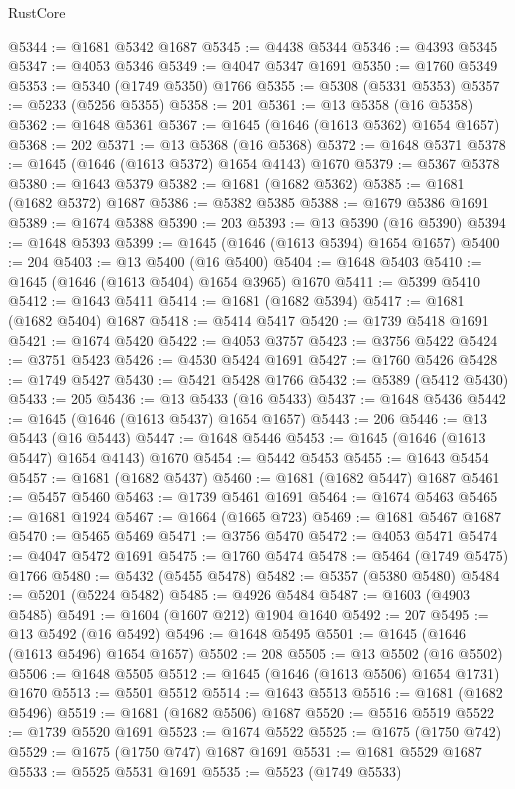 \begin{lexlean}{RustCore}
\begin{coremodule}
@5344 := @1681 @5342 @1687
@5345 := @4438 @5344
@5346 := @4393 @5345
@5347 := @4053 @5346
@5349 := @4047 @5347 @1691
@5350 := @1760 @5349
@5353 := @5340 (@1749 @5350) @1766
@5355 := @5308 (@5331 @5353)
@5357 := @5233 (@5256 @5355)
@5358 := 201
@5361 := @13 @5358 (@16 @5358)
@5362 := @1648 @5361
@5367 := @1645 (@1646 (@1613 @5362) @1654 @1657)
@5368 := 202
@5371 := @13 @5368 (@16 @5368)
@5372 := @1648 @5371
@5378 := @1645 (@1646 (@1613 @5372) @1654 @4143) @1670
@5379 := @5367 @5378
@5380 := @1643 @5379
@5382 := @1681 (@1682 @5362)
@5385 := @1681 (@1682 @5372) @1687
@5386 := @5382 @5385
@5388 := @1679 @5386 @1691
@5389 := @1674 @5388
@5390 := 203
@5393 := @13 @5390 (@16 @5390)
@5394 := @1648 @5393
@5399 := @1645 (@1646 (@1613 @5394) @1654 @1657)
@5400 := 204
@5403 := @13 @5400 (@16 @5400)
@5404 := @1648 @5403
@5410 := @1645 (@1646 (@1613 @5404) @1654 @3965) @1670
@5411 := @5399 @5410
@5412 := @1643 @5411
@5414 := @1681 (@1682 @5394)
@5417 := @1681 (@1682 @5404) @1687
@5418 := @5414 @5417
@5420 := @1739 @5418 @1691
@5421 := @1674 @5420
@5422 := @4053 @3757
@5423 := @3756 @5422
@5424 := @3751 @5423
@5426 := @4530 @5424 @1691
@5427 := @1760 @5426
@5428 := @1749 @5427
@5430 := @5421 @5428 @1766
@5432 := @5389 (@5412 @5430)
@5433 := 205
@5436 := @13 @5433 (@16 @5433)
@5437 := @1648 @5436
@5442 := @1645 (@1646 (@1613 @5437) @1654 @1657)
@5443 := 206
@5446 := @13 @5443 (@16 @5443)
@5447 := @1648 @5446
@5453 := @1645 (@1646 (@1613 @5447) @1654 @4143) @1670
@5454 := @5442 @5453
@5455 := @1643 @5454
@5457 := @1681 (@1682 @5437)
@5460 := @1681 (@1682 @5447) @1687
@5461 := @5457 @5460
@5463 := @1739 @5461 @1691
@5464 := @1674 @5463
@5465 := @1681 @1924
@5467 := @1664 (@1665 @723)
@5469 := @1681 @5467 @1687
@5470 := @5465 @5469
@5471 := @3756 @5470
@5472 := @4053 @5471
@5474 := @4047 @5472 @1691
@5475 := @1760 @5474
@5478 := @5464 (@1749 @5475) @1766
@5480 := @5432 (@5455 @5478)
@5482 := @5357 (@5380 @5480)
@5484 := @5201 (@5224 @5482)
@5485 := @4926 @5484
@5487 := @1603 (@4903 @5485)
@5491 := @1604 (@1607 @212) @1904 @1640
@5492 := 207
@5495 := @13 @5492 (@16 @5492)
@5496 := @1648 @5495
@5501 := @1645 (@1646 (@1613 @5496) @1654 @1657)
@5502 := 208
@5505 := @13 @5502 (@16 @5502)
@5506 := @1648 @5505
@5512 := @1645 (@1646 (@1613 @5506) @1654 @1731) @1670
@5513 := @5501 @5512
@5514 := @1643 @5513
@5516 := @1681 (@1682 @5496)
@5519 := @1681 (@1682 @5506) @1687
@5520 := @5516 @5519
@5522 := @1739 @5520 @1691
@5523 := @1674 @5522
@5525 := @1675 (@1750 @742)
@5529 := @1675 (@1750 @747) @1687 @1691
@5531 := @1681 @5529 @1687
@5533 := @5525 @5531 @1691
@5535 := @5523 (@1749 @5533)

\end{coremodule}
\end{lexlean}
